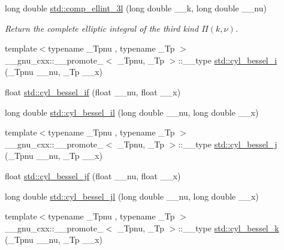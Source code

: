 \begin{DoxyCompactItemize}
long double \hyperlink{group__tr29124__math__spec__func_ga1ca081fee102cd0d4d6b091285e495e5}{std\+::comp\+\_\+ellint\+\_\+3l} (long double \+\_\+\+\_\+k, long double \+\_\+\+\_\+nu)
\begin{DoxyCompactList}\small\item\em Return the complete elliptic integral of the third kind $ \Pi(k,\nu) $. \end{DoxyCompactList}\item 
{\footnotesize template$<$typename \+\_\+\+Tpnu , typename \+\_\+\+Tp $>$ }\\\+\_\+\+\_\+gnu\+\_\+cxx\+::\+\_\+\+\_\+promote\+\_$<$ \+\_\+\+Tpnu, \+\_\+\+Tp $>$\+::\+\_\+\+\_\+type \hyperlink{group__tr29124__math__spec__func_ga1c9b5a5c36f000a4f0a55f7fcc486cb0}{std\+::cyl\+\_\+bessel\+\_\+i} (\+\_\+\+Tpnu \+\_\+\+\_\+nu, \+\_\+\+Tp \+\_\+\+\_\+x)
\item 
float \hyperlink{group__tr29124__math__spec__func_gaaf738427d4da0bda66bc2274dfb853a7}{std\+::cyl\+\_\+bessel\+\_\+if} (float \+\_\+\+\_\+nu, float \+\_\+\+\_\+x)
\item 
long double \hyperlink{group__tr29124__math__spec__func_gab7962629216d03efb8ecaa3f70c6878f}{std\+::cyl\+\_\+bessel\+\_\+il} (long double \+\_\+\+\_\+nu, long double \+\_\+\+\_\+x)
\item 
{\footnotesize template$<$typename \+\_\+\+Tpnu , typename \+\_\+\+Tp $>$ }\\\+\_\+\+\_\+gnu\+\_\+cxx\+::\+\_\+\+\_\+promote\+\_$<$ \+\_\+\+Tpnu, \+\_\+\+Tp $>$\+::\+\_\+\+\_\+type \hyperlink{group__tr29124__math__spec__func_ga47e21a13b6d68d0d7f057699bd3b3ce0}{std\+::cyl\+\_\+bessel\+\_\+j} (\+\_\+\+Tpnu \+\_\+\+\_\+nu, \+\_\+\+Tp \+\_\+\+\_\+x)
\item 
float \hyperlink{group__tr29124__math__spec__func_ga15731a7bccd6351d28353e3c4c2a2d23}{std\+::cyl\+\_\+bessel\+\_\+jf} (float \+\_\+\+\_\+nu, float \+\_\+\+\_\+x)
\item 
long double \hyperlink{group__tr29124__math__spec__func_gade8e94a80520a8b628b2d658755b25c0}{std\+::cyl\+\_\+bessel\+\_\+jl} (long double \+\_\+\+\_\+nu, long double \+\_\+\+\_\+x)
\item 
{\footnotesize template$<$typename \+\_\+\+Tpnu , typename \+\_\+\+Tp $>$ }\\\+\_\+\+\_\+gnu\+\_\+cxx\+::\+\_\+\+\_\+promote\+\_$<$ \+\_\+\+Tpnu, \+\_\+\+Tp $>$\+::\+\_\+\+\_\+type \hyperlink{group__tr29124__math__spec__func_ga76dcd3884620955680112aca0d327ada}{std\+::cyl\+\_\+bessel\+\_\+k} (\+\_\+\+Tpnu \+\_\+\+\_\+nu, \+\_\+\+Tp \+\_\+\+\_\+x)

\end{DoxyCompactItemize}
